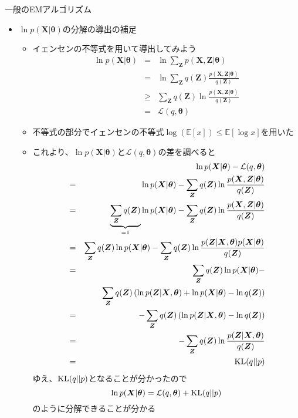 \documentclass[dvipdfmx,notheorems,t]{beamer}
\begin{document}
\begin{frame}{一般のEMアルゴリズム}

\begin{itemize}
	\item $\ln p(\bm{X} | \bm{\theta})$の分解の導出の補足
	\begin{itemize}
		\item イェンセンの不等式を用いて導出してみよう
		\begin{eqnarray}
			\ln p(\bm{X} | \bm{\theta}) &=& \ln \sum_{\bm{Z}} p(\bm{X}, \bm{Z} | \bm{\theta}) \nonumber \\
			&=& \ln \sum_{\bm{Z}} q(\bm{Z}) \frac{p(\bm{X}, \bm{Z} | \bm{\theta})}{q(\bm{Z})} \nonumber \\
			&\ge& \sum_{\bm{Z}} q(\bm{Z}) \ln \frac{p(\bm{X}, \bm{Z} | \bm{\theta})}{q(\bm{Z})} \nonumber \\
			&=& \mathcal{L}(q, \bm{\theta})
		\end{eqnarray}
		
		\item 不等式の部分でイェンセンの不等式$\log (\mathbb{E}[x]) \le \mathbb{E}[\log x]$を用いた
		\item これより、$\ln p(\bm{X} | \bm{\theta})$と$\mathcal{L}(q, \bm{\theta})$の差を調べると
		\begin{eqnarray}
			&& \ln p(\bm{X} | \bm{\theta}) - \mathcal{L}(q, \bm{\theta}) \nonumber \\
			&=& \ln p(\bm{X} | \bm{\theta}) - \sum_{\bm{Z}} q(\bm{Z}) \ln \frac{p(\bm{X}, \bm{Z} | \bm{\theta})}{q(\bm{Z})} \nonumber \\
			&=& \underbrace{\sum_{\bm{Z}} q(\bm{Z})}_{=1} \ln p(\bm{X} | \bm{\theta}) - \sum_{\bm{Z}} q(\bm{Z}) \ln \frac{p(\bm{X}, \bm{Z} | \bm{\theta})}{q(\bm{Z})} \nonumber \\
			&=& \sum_{\bm{Z}} q(\bm{Z}) \ln p(\bm{X} | \bm{\theta}) - \sum_{\bm{Z}} q(\bm{Z}) \ln \frac{p(\bm{Z} | \bm{X}, \bm{\theta}) p(\bm{X} | \bm{\theta})}{q(\bm{Z})} \nonumber \\
			&=& \sum_{\bm{Z}} q(\bm{Z}) \ln p(\bm{X} | \bm{\theta}) - \nonumber \\
			&& \qquad \sum_{\bm{Z}} q(\bm{Z}) \left( \ln p(\bm{Z} | \bm{X}, \bm{\theta}) + \ln p(\bm{X} | \bm{\theta}) - \ln q(\bm{Z}) \right) \nonumber \\
			&=& -\sum_{\bm{Z}} q(\bm{Z}) \left( \ln p(\bm{Z} | \bm{X}, \bm{\theta}) - \ln q(\bm{Z}) \right) \nonumber \\
			&=& -\sum_{\bm{Z}} q(\bm{Z}) \ln \frac{p(\bm{Z} | \bm{X}, \bm{\theta})}{q(\bm{Z})} \nonumber \\
			&=& \operatorname{KL} (q || p)
		\end{eqnarray}
		ゆえ、$\operatorname{KL} (q || p)$となることが分かったので
		\begin{equation}
			\ln p(\bm{X} | \bm{\theta}) = \mathcal{L}(q, \bm{\theta}) + \operatorname{KL} (q || p)
		\end{equation}
		のように分解できることが分かる
	\end{itemize}
\end{itemize}

\end{frame}
\end{document}
